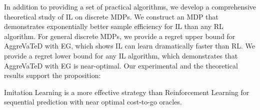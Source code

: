 \documentclass{article}
\newcommand{\BB}[1]{\textcolor{red}{\bf Byron: {#1}}}
\newcommand{\drew}[1]{\textcolor{blue}{\bf Drew: {#1}}}
\newcommand{\todo}{\textcolor{red}{\textbf{[TODO]}}}
\begin{document}

In addition to providing a set of practical algorithms, we develop a comprehensive theoretical study of IL on discrete MDPs. We construct an MDP that demonstrates exponentially better sample efficiency for IL than any RL algorithm. For general discrete MDPs, we provide a regret upper bound for AggreVaTeD with EG, which shows IL can learn dramatically faster than RL. We provide a regret lower bound for any IL algorithm, which demonstrates that AggreVaTeD with EG is near-optimal. Our experimental and the theoretical results support the proposition: 
\begin{displayquote}
Imitation Learning is a more effective strategy than Reinforcement Learning for sequential prediction with near optimal cost-to-go oracles.
\end{displayquote}




\end{document}
